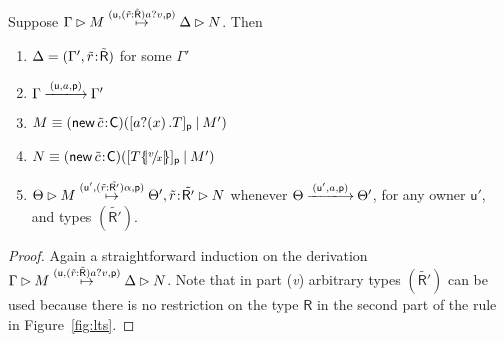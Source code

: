 \documentclass{LMCS}
\makeatletter
\newcommand{\pfn}[1]{\mathsf{#1}}  \newcommand{\cfn}[1]{\mathsf{#1}}  \newcommand{\ownfnt}[1]{{\mathsf{#1}}}
\newcommand{\with}{\mathbin \rhd}
\newcommand{\cancom}[3]{({\ownfnt{#1}},{#2},{\ownfnt{#3}}) \xspace}
\newcommand{\typeletter}[1]{{\mathsf{#1}}}
\newcommand{\tR}{\typeletter{R}}
\newcommand{\tC}{\typeletter{C}}
\newcommand{\pa}[1]{\!\left(#1\right)}
\newcommand{\Cassoc}[2]{ {{#1}\kern -0.2em : \kern -0.2em {#2}}}
\newcommand{\Cnew}[2]{(\mathop{\pfn{new}} \Cassoc{#1}{#2})}
\newcommand{\Cpar}{\mathbin{|}}
\newcommand{\Cloc}[2]{[#1]_{\ownfnt{#2}}}
\newcommand{\ar}[1]{\mathbin{\xlongrightarrow{ #1}}}
\newcommand{\structeq}{\equiv}
\newcommand{\lsetbar}{\mathopen{\{\hspace{-.24em}\vert}}
\newcommand{\rsetbar}{\mathclose{\vert\hspace{-.24em}\}}}
\newcommand{\smallscript}{\mathchoice{\scriptstyle}{\scriptstyle}{\scriptscriptstyle}{\scriptscriptstyle}}
\newcommand{\@subst@brackets}[1]{\lsetbar #1 \rsetbar}
\newcommand{\@subst}[2]{{\overset{#2}{\phantom{.}}} \!/\! {\smallscript #1}}
\newcommand{\subst}[2]{\@subst@brackets{\@subst{#1}{#2}}}
\makeatother
\begin{document}
\begin{lem}\label{lemma:derin1}
  Suppose $\Gamma \with M \newar{\cancom{u}{(\tilde{r}:\tilde{\tR})a?v}{p}} \Delta \with N$.
Then
\begin{enumerate}[\em(i)]
\item $\Delta = (\Gamma', \Cassoc{\tilde{r}}{\tilde{\tR}})$ for some $\Gamma'$
\item $\Gamma \ar{\cancom{u}{a}{p}} \Gamma'$ \item $M \structeq \Cnew{\tilde{c}}{{\tC}} (\Cloc{a?\pa{x}. T}{p} \Cpar M')$
\item $N \structeq \Cnew{\tilde{c}}{{\tC}} (\Cloc{T \subst{x}{v}}{p} \Cpar M')$
\item  $\Theta \with M \newar{\cancom{u'}{(\tilde{r}:\tilde{\tR'})\alpha}{p}} 
        \Theta',  \Cassoc{\tilde{r}}{\tilde{\tR'}} \with N$ 
whenever
$\Theta \ar{\cancom{u'}{a}{p}} \Theta'$, for any owner $\ownfnt u'$, 
and types $(\tilde{\tR'})$. 
\end{enumerate}
\end{lem}
\begin{proof}
  Again a straightforward induction on the derivation
$\Gamma \with M \newar{\cancom{u}{(\tilde{r}:\tilde{\tR})a?v}{p}} \Delta \with N$.
Note that in part ({\emph v}) arbitrary types $(\tilde{\tR'})$ can be used because there is no
restriction on the type $\tR$  in the second part of the rule  in 
Figure~\ref{fig:lts}. 
\end{proof}
\end{document}
